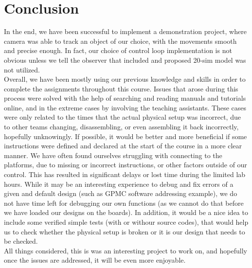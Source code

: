 \newpage
\section{Conclusion}

In the end, we have been successful to implement a demonstration project, where camera was able to track an object of our choice, with the movements smooth and precise enough. In fact, our choice of control loop implementation is not obvious unless we tell the observer that included and proposed 20-sim model was not utilized.\\

Overall, we have been mostly using our previous knowledge and skills in order to complete the assignments throughout this course. Issues that arose during this process were solved with the help of searching and reading manuals and tutorials online, and in the extreme cases by involving the teaching assistants. These cases were only related to the times that the actual physical setup was incorrect, due to other teams changing, disassembling, or even assembling it back incorrectly, hopefully unknowingly. If possible, it would be better and more beneficial if some instructions were defined and declared at the start of the course in a more clear manner. We have often found ourselves struggling with connecting to the platforms, due to missing or incorrect instructions, or other factors outside of our control. This has resulted in significant delays or lost time during the limited lab hours. While it may be an interesting experience to debug and fix errors of a given and default design (such as GPMC software addressing example), we do not have time left for debugging our own functions (as we cannot do that before we have loaded our designs on the boards). In addition, it would be a nice idea to include some verified simple tests (with or withour source codes), that would help us to check whether the physical setup is broken or it is our design that needs to be checked.\\

All things considered, this is was an interesting project to work on, and hopefully once the issues are addressed, it will be even more enjoyable.